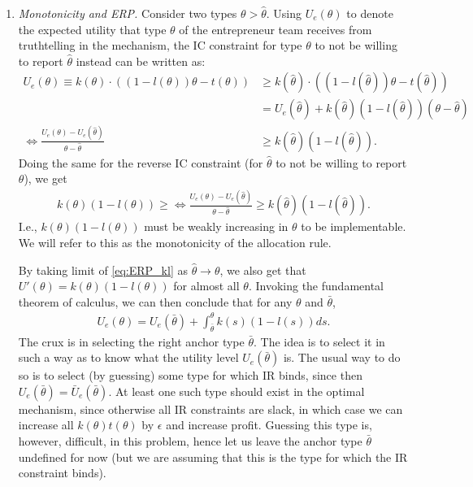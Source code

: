 \documentclass[a4paper]{article}
\begin{document}
	\begin{enumerate}
		\item \emph{Monotonicity and ERP.} Consider two types $\theta > \hat{\theta}$. Using $U_e(\theta)$ to denote the expected utility that type $\theta$ of the entrepreneur team receives from truthtelling in the mechanism, the IC constraint for type $\theta$ to not be willing to report $\hat{\theta}$ instead can be written as:
		\begin{align*}
			U_e(\theta) \equiv k(\theta) \cdot \left( (1-l(\theta)) \theta - t(\theta) \right)
			& \geq 
			k(\hat{\theta}) \cdot \left( (1-l(\hat{\theta})) \theta - t(\hat{\theta}) \right)
			\\
			& = U_e(\hat{\theta}) + k(\hat{\theta}) (1-l(\hat{\theta})) (\theta -\hat{\theta})
			\\
			\Leftrightarrow \frac{U_e(\theta)-U_e(\hat{\theta})}{\theta-\hat{\theta}} & \geq k(\hat{\theta}) (1-l(\hat{\theta})).
		\end{align*}
		Doing the same for the reverse IC constraint (for $\hat{\theta}$ to not be willing to report $\theta$), we get
		\begin{align}
			k({\theta}) (1-l({\theta})) \geq \Leftrightarrow \frac{U_e(\theta)-U_e(\hat{\theta})}{\theta-\hat{\theta}} \geq k(\hat{\theta}) (1-l(\hat{\theta})).
			\label{eq:ERP_kl}
		\end{align}
		I.e., $k(\theta)(1-l(\theta))$ must be weakly increasing in $\theta$ to be implementable. We will refer to this as the monotonicity of the allocation rule.
		
		By taking limit of \eqref{eq:ERP_kl} as $\hat{\theta}\to \theta$, we also get that $U'(\theta) = k(\theta) (1-l(\theta))$ for almost all $\theta$. Invoking the fundamental theorem of calculus, we can then conclude that for any $\theta$ and $\bar{\theta}$,
		\begin{align}
			U_e(\theta) = U_e(\bar{\theta}) + \int_{\bar{\theta}}^\theta k(s) (1-l(s)) ds.
			\label{eq:ERP_kl3}
		\end{align}
		The crux is in selecting the right anchor type $\bar{\theta}$. The idea is to select it in such a way as to know what the utility level $U_e(\bar{\theta})$ is. The usual way to do so is to select (by guessing) some type for which IR binds, since then $U_e(\bar{\theta}) = \bar{U}_e(\bar{\theta})$. At least one such type should exist in the optimal mechanism, since otherwise all IR constraints are slack, in which case we can increase all $k(\theta)t(\theta)$ by $\epsilon$ and increase profit. Guessing this type is, however, difficult, in this problem, hence let us leave the anchor type $\bar{\theta}$ undefined for now (but we are assuming that this is the type for which the IR constraint binds).
		

\end{enumerate}
\end{document}
